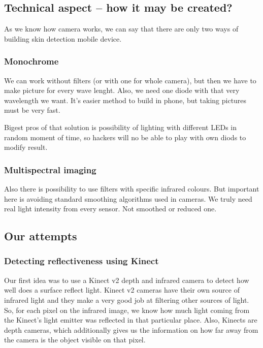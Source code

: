     \subsection{Technical aspect -- how it may be created?}
        As we know how camera works, we can say that there are only two ways of
        building skin detection mobile device.
        \subsubsection*{Monochrome}
            We can work without filters (or with one for whole camera),
            but then we have to make picture for every wave lenght.
            Also, we need one diode with that very wavelength we want.
            It's easier method to build in phone, but taking pictures
            must be very fast.

            Bigest pros of that solution is possibility of lighting
            with different LEDs in random moment of time, so hackers
            will no be able to play with own diods to modify result.

        \subsubsection*{Multispectral imaging}
            Also there is possibility to use filters with specific infrared colours.
            But important here is avoiding standard smoothing algorithms used
            in cameras. We truly need real light intensity from every sensor.
            Not smoothed or reduced one.

    \subsection{Our attempts}

        \subsubsection{Detecting reflectiveness using Kinect}
            Our first idea was to use a Kinect v2 depth and infrared camera to detect
            how well does a surface reflect light.
            Kinect v2 cameras have their own source of infrared light and they make
            a very good job at filtering other sources of light.
            So, for each pixel on the infrared image, we know how much light coming
            from the Kinect's light emitter was reflected in that particular place.
            Also, Kinects are depth cameras, which additionally gives us the information
            on how far away from the camera is the object visible on that pixel.

